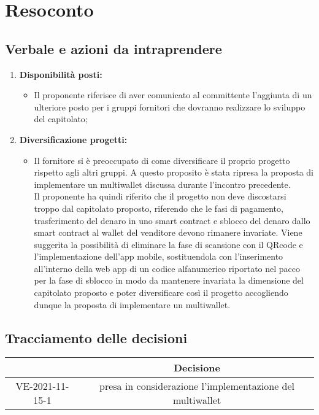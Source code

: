 \section{Resoconto}
\subsection{Verbale e azioni da intraprendere}

\begin{enumerate}
	\item \textbf{Disponibilità posti:}
	\begin{itemize}
		\item Il proponente riferisce di aver comunicato al committente l'aggiunta di un ulteriore posto per i gruppi fornitori che dovranno realizzare lo sviluppo del capitolato;
	\end{itemize}

	\item \textbf{Diversificazione progetti:}
	\begin{itemize}
		\item Il fornitore si è preoccupato di come diversificare il proprio progetto rispetto agli altri gruppi.
		A questo proposito è stata ripresa la proposta di implementare un multiwallet discussa durante l'incontro precedente.\\
		Il proponente ha quindi riferito che il progetto non deve discostarsi troppo dal capitolato proposto, riferendo che le fasi di pagamento, trasferimento del denaro in uno smart contract e sblocco del denaro dallo smart contract al wallet del venditore devono rimanere invariate.
		Viene suggerita la possibilità di eliminare la fase di scansione con il QRcode e l'implementazione dell'app mobile,
		sostituendola con l'inserimento all'interno della web app di un codice alfanumerico riportato nel pacco per la fase di sblocco
		in modo da mantenere invariata la dimensione del capitolato proposto e poter diversificare così il progetto
		accogliendo dunque la proposta di implementare un multiwallet.
	\end{itemize}

	

\end{enumerate}

\pagebreak

\subsection{Tracciamento delle decisioni}

\begin{table}[H]
	\centering
	\renewcommand{\arraystretch}{1.8}
	\begin{tabular}{c | c}
		\rowcolor[HTML]{125e28}
		\multicolumn{1}{c}{\color[HTML]{FFFFFF} \textbf{ID}} &
		\multicolumn{1}{c}{\color[HTML]{FFFFFF} \textbf{Decisione}} \\
		\hline
		VE-2021-11-15-1 & presa in considerazione l'implementazione del multiwallet\\ \hline

	\end{tabular}
\end{table}